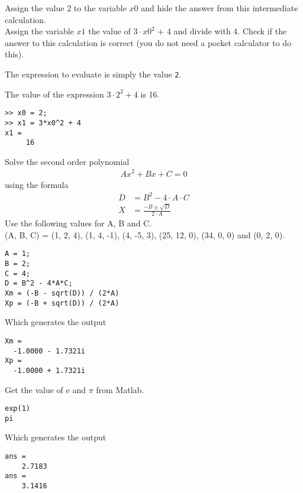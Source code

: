 \begin{ex}
Assign the value 2 to the variable $x0$ and hide the answer from this intermediate
calculation.\\
Assign the variable $x1$ the value of $3 \cdot x0^2$ + 4 and divide with 4. Check if the answer to
this calculation is correct (you do not need a pocket calculator to do this).
\begin{hint}
The expression to evaluate is simply the value \verb!2!.
\end{hint}
\begin{secondhint}
The value of the expression $3 \cdot 2^2 + 4$ is 16.
\end{secondhint}
\begin{sol}
\begin{lstlisting}
>> x0 = 2;
>> x1 = 3*x0^2 + 4
x1 = 
     16
\end{lstlisting}
\end{sol}
\end{ex}
\known{=, \^}


\begin{ex}
Solve the second order polynomial
\begin{align}
A x^2 + B x + C = 0
\end{align}
using the formula
\begin{align}
D & = B^2 - 4 \cdot A \cdot C	\\
X & = \frac{-B\pm \sqrt{D}}{2 \cdot A}
\end{align}
Use the following values for A, B and C.\\ \noindent
(A, B, C) = (1, 2, 4), (1, 4, -1), (4, -5, 3), (25, 12, 0), (34, 0, 0) and (0, 2, 0).
\begin{sol}
\begin{lstlisting}
A = 1;
B = 2; 
C = 4;
D = B^2 - 4*A*C;
Xm = (-B - sqrt(D)) / (2*A)
Xp = (-B + sqrt(D)) / (2*A)
\end{lstlisting}
Which generates the output
\begin{lstlisting}
Xm =
  -1.0000 - 1.7321i
Xp =
  -1.0000 + 1.7321i
\end{lstlisting}
\end{sol}
\end{ex}

\begin{ex}
Get the value of e and $\pi$ from Matlab.
\begin{sol}
\begin{lstlisting}
exp(1)
pi
\end{lstlisting}
Which generates the output
\begin{lstlisting}
ans =
    2.7183
ans =
    3.1416
\end{lstlisting}
\end{sol}
\end{ex}

